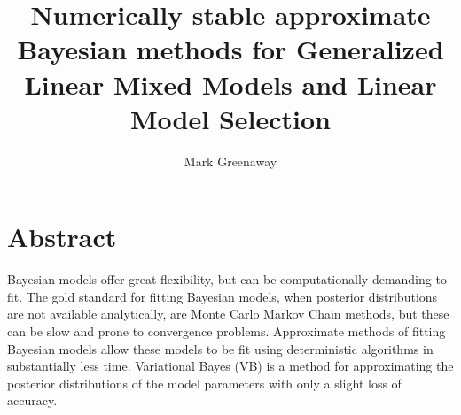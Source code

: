\documentclass[PhD,stats]{usydthesis}[12pt]
\title{Numerically stable approximate Bayesian methods
    	 for Generalized Linear Mixed Models
			 and Linear Model Selection}
\author{Mark Greenaway}
\begin{document}
\makeatletter
 
 


\makeatother

\maketitle

\tableofcontents
\listoffigures

\section{Abstract}

Bayesian models offer great flexibility, but can be computationally demanding to fit. The gold standard for
fitting Bayesian models, when posterior  distributions are not available analytically, are Monte Carlo Markov
Chain methods, but these can be slow and prone to convergence problems. Approximate methods of fitting
Bayesian models allow these models to be fit using deterministic algorithms in substantially less time.
Variational Bayes (VB) is a method for approximating the posterior distributions of the model parameters with
only a slight loss of accuracy.
\end{document}
